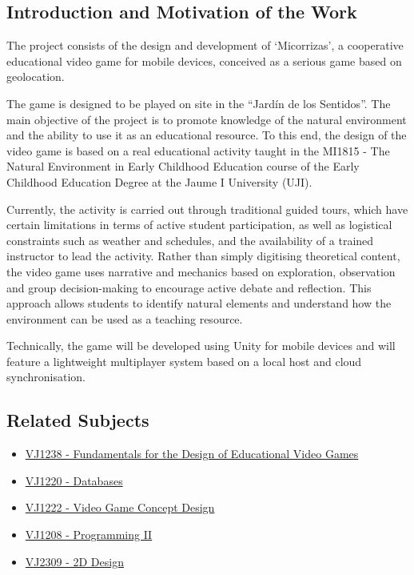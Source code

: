 \subsection{Introduction and Motivation of the Work}
\begin{segment}
The project consists of the design and development of ‘Micorrizas’, a cooperative educational video game for mobile devices, conceived as a serious game based on geolocation.

\vspace*{0.5cm}

The game is designed to be played on site in the “Jardín de los Sentidos”. The main objective of the project is to promote knowledge of the natural environment and the ability to use it as an educational resource. To this end, the design of the video game is based on a real educational activity taught in the MI1815 - The Natural Environment in Early Childhood Education course of the Early Childhood Education Degree at the Jaume I University (UJI).

Currently, the activity is carried out through traditional guided tours, which have certain limitations in terms of active student participation, as well as logistical constraints such as weather and schedules, and the availability of a trained instructor to lead the activity. Rather than simply digitising theoretical content, the video game uses narrative and mechanics based on exploration, observation and group decision-making to encourage active debate and reflection. This approach allows students to identify natural elements and understand how the environment can be used as a teaching resource.

Technically, the game will be developed using Unity for mobile devices and will feature a lightweight multiplayer system based on a local host and cloud synchronisation.
\end{segment}

\subsection{Related Subjects}
\begin{itemize}
    \item \href{https://ujiapps.uji.es/sia/rest/publicacion/2025/estudio/231/asignatura/VJ1238}{VJ1238 - Fundamentals for the Design of Educational Video Games}
    \item \href{https://ujiapps.uji.es/sia/rest/publicacion/2025/estudio/231/asignatura/VJ1220}{VJ1220 - Databases}
    \item \href{https://ujiapps.uji.es/sia/rest/publicacion/2025/estudio/231/asignatura/VJ1222}{VJ1222 - Video Game Concept Design}
    \item \href{https://ujiapps.uji.es/sia/rest/publicacion/2025/estudio/231/asignatura/VJ1208}{VJ1208 - Programming II}
    \item \href{https://ujiapps.uji.es/sia/rest/publicacion/2025/estudio/231/asignatura/VJ1209}{VJ2309 - 2D Design}
\end{itemize}



